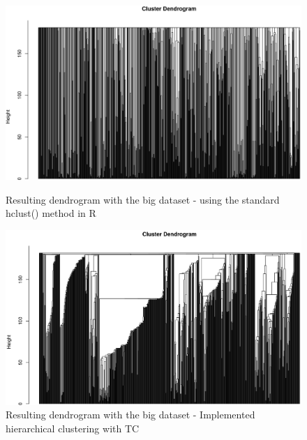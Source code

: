 \documentclass[a4paper,10pt]{article}
\theoremstyle{plain}
\theoremstyle{definition}
\begin{document}
\begin{figure}[H]
	\centering
	\begin{minipage}{0.75\textwidth}
		\includegraphics[width=1\textwidth]{./pictures/dendrogramHclustBigData.png}
		\caption{Resulting dendrogram with the big dataset - using the standard hclust() method in R}
		\label{fig:dendrogramHclustStandardBigData}
	\end{minipage}
	\begin{minipage}{0.75\textwidth}
		\includegraphics[width=1\textwidth]{./pictures/dendrogramBigDataHcImplemented.png}
		\caption{Resulting dendrogram with the big dataset - Implemented hierarchical clustering with TC}
		\label{fig:dendrogramHcImplementedBigData}
	\end{minipage}
\end{figure}

\end{document}

